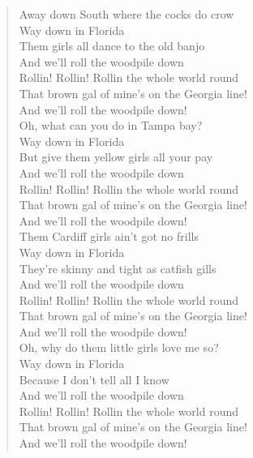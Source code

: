 \documentclass[11pt]{article}
\begin{document}
\begin{verse}
Away down South where the cocks do crow\\
Way down in Florida\\
Them girls all dance to the old banjo\\
And we'll roll the woodpile down\\
\vspace*{1em}
Rollin! Rollin! Rollin the whole world round\\
That brown gal of mine's on the Georgia line!\\
And we'll roll the woodpile down!\\
\vspace*{1em}
Oh, what can you do in Tampa bay?\\
Way down in Florida\\
But give them yellow girls all your pay\\
And we'll roll the woodpile down\\
\vspace*{1em}
Rollin! Rollin! Rollin the whole world round\\
That brown gal of mine's on the Georgia line!\\
And we'll roll the woodpile down!\\
\vspace*{1em}
Them Cardiff girls ain't got no frills\\
Way down in Florida\\
They're skinny and tight as catfish gills\\
And we'll roll the woodpile down\\
\vspace*{1em}
Rollin! Rollin! Rollin the whole world round\\
That brown gal of mine's on the Georgia line!\\
And we'll roll the woodpile down!\\
\vspace*{1em}
Oh, why do them little girls love me so?\\
Way down in Florida\\
Because I don't tell all I know\\
And we'll roll the woodpile down\\
\vspace*{1em}
Rollin! Rollin! Rollin the whole world round\\
That brown gal of mine's on the Georgia line!\\
And we'll roll the woodpile down!\\

\end{verse}
\end{document}
